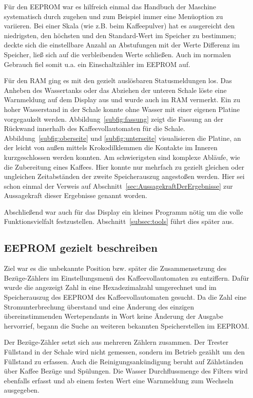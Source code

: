 Für den \ac{EEPROM} war es hilfreich einmal das Handbuch der Maschine systematisch durch zugehen und zum Beispiel immer eine Menüoption zu variieren.
Bei einer Skala (wie z.B. beim Kaffeepulver) hat es ausgereicht den niedrigsten, den höchsten und den Standard-Wert im Speicher zu bestimmen;
deckte sich die einstellbare Anzahl an Abstufungen mit der Werte Differenz im Speicher, ließ sich auf die verbleibenden Werte schließen.
Auch im normalen Gebrauch fiel somit u.a. ein Einschaltzähler im \ac{EEPROM} auf.

Für den \ac{RAM} ging es mit den gezielt auslösbaren Statusmeldungen los.
Das Anheben des Wassertanks oder das Abziehen der unteren Schale löste eine Warnmeldung auf dem Display aus und wurde auch im \ac{RAM} vermerkt.
Ein zu hoher Wasserstand in der Schale konnte ohne Wasser mit einer eigenen Platine vorgegaukelt werden.
Abbildung~\ref{subfig:fassung} zeigt die Fassung an der Rückwand innerhalb des Kaffeevollautomaten für die Schale.
Abbildung~\ref{subfig:oberseite} und \ref{subfig:unterseite} visualisieren die Platine, an der leicht von außen mittels Krokodilklemmen die Kontakte im Inneren kurzgeschlossen werden konnten.
Am schwierigsten sind komplexe Abläufe, wie die Zubereitung eines Kaffees.
Hier konnte nur mehrfach zu gezielt gleichen oder ungleichen Zeitabständen der zweite Speicherauszug angestoßen werden.
Hier sei schon einmal der Verweis auf Abschnitt~\ref{sec:AussagekraftDerErgebnisse} zur Aussagekraft dieser Ergebnisse genannt worden.

Abschließend war auch für das Display ein kleines Programm nötig um die volle Funktionsvielfalt festzustellen.
Abschnitt~\ref{subsec:tools} führt dies später aus.

\subsection{EEPROM gezielt beschreiben}\label{subsec:Vorgehen2}
Ziel war es die unbekannte Position bzw. später die Zusammensetzung des Bezüge-Zählers im Einstellungsmenü des Kaffeevollautomaten zu entziffern.
Dafür wurde die angezeigt Zahl in eine Hexadezimalzahl umgerechnet und im Speicherauszug des \ac{EEPROM} des Kaffeevollautomaten gesucht.
Da die Zahl eine Stromunterbrechung überstand und eine Änderung des einzigen übereinstimmenden Wertependants in Wort  keine Änderung der Ausgabe hervorrief, begann die Suche an weiteren bekannten Speicherstellen im \ac{EEPROM}.

Der Bezüge-Zähler setzt sich aus mehreren Zählern zusammen.
Der Trester Füllstand in der Schale wird nicht gemessen, sondern im Betrieb gezählt um den Füllstand zu erfassen.
Auch die Reinigungsankündigung beruht auf Zählständen über Kaffee Bezüge und Spülungen.
Die Wasser Durchflussmenge des Filters wird ebenfalls erfasst und ab einem festen Wert eine Warnmeldung zum Wechseln ausgegeben.

